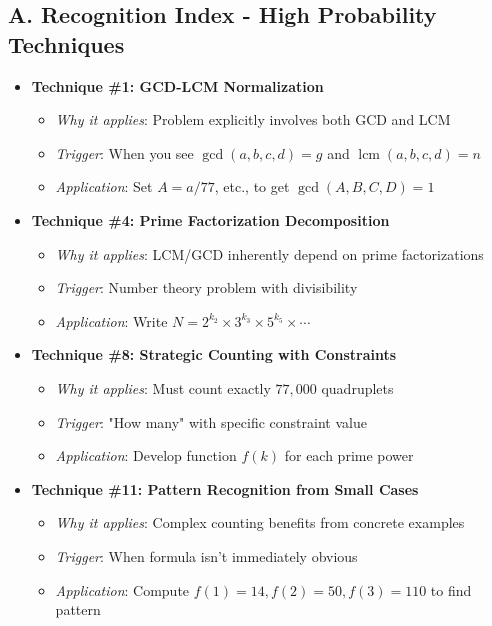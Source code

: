 \documentclass[11pt]{article}
\begin{document}
\begin{conversionbox}
\subsection*{A. Recognition Index - High Probability Techniques}
\begin{itemize}[leftmargin=*]
    \item \textbf{Technique \#1: GCD-LCM Normalization}
    \begin{itemize}
        \item \textit{Why it applies}: Problem explicitly involves both GCD and LCM
        \item \textit{Trigger}: When you see $\gcd(a,b,c,d) = g$ and $\operatorname{lcm}(a,b,c,d) = n$
        \item \textit{Application}: Set $A = a/77$, etc., to get $\gcd(A,B,C,D) = 1$
    \end{itemize}
    
    \item \textbf{Technique \#4: Prime Factorization Decomposition}
    \begin{itemize}
        \item \textit{Why it applies}: LCM/GCD inherently depend on prime factorizations
        \item \textit{Trigger}: Number theory problem with divisibility
        \item \textit{Application}: Write $N = 2^{k_2} \times 3^{k_3} \times 5^{k_5} \times \cdots$
    \end{itemize}
    
    \item \textbf{Technique \#8: Strategic Counting with Constraints}
    \begin{itemize}
        \item \textit{Why it applies}: Must count exactly $77,000$ quadruplets
        \item \textit{Trigger}: "How many" with specific constraint value
        \item \textit{Application}: Develop function $f(k)$ for each prime power
    \end{itemize}
    
    \item \textbf{Technique \#11: Pattern Recognition from Small Cases}
    \begin{itemize}
        \item \textit{Why it applies}: Complex counting benefits from concrete examples
        \item \textit{Trigger}: When formula isn't immediately obvious
        \item \textit{Application}: Compute $f(1) = 14, f(2) = 50, f(3) = 110$ to find pattern
    \end{itemize}
\end{itemize}


\end{conversionbox}
\end{document}
